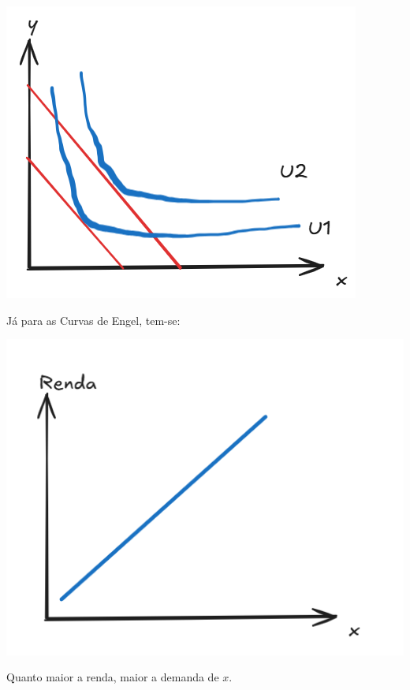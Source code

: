 \documentclass[
  letterpaper,
  DIV=11,
  numbers=noendperiod]{scrartcl}
\begin{document}
\begin{center}
\includegraphics{aumentorenda.png}
\end{center}

Já para as Curvas de Engel, tem-se:

\begin{center}
\includegraphics{engelnormal.png}
\end{center}
Quanto maior a renda, maior a demanda de \(x\).
\end{document}
